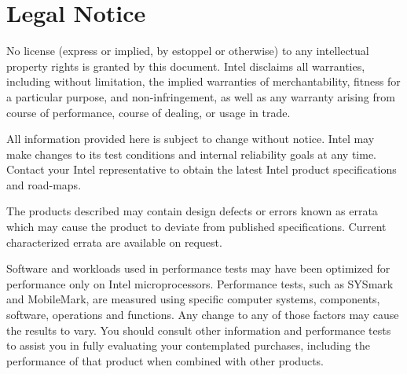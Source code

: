\hypertarget{index_DISCLAIMER}{}\section{Legal Notice}\label{index_DISCLAIMER}
No license (express or implied, by estoppel or otherwise) to any intellectual property rights is granted by this document. Intel disclaims all warranties, including without limitation, the implied warranties of merchantability, fitness for a particular purpose, and non-\/infringement, as well as any warranty arising from course of performance, course of dealing, or usage in trade. \par
All information provided here is subject to change without notice. Intel may make changes to its test conditions and internal reliability goals at any time. Contact your Intel representative to obtain the latest Intel product specifications and road-\/maps. \par
The products described may contain design defects or errors known as errata which may cause the product to deviate from published specifications. Current characterized errata are available on request. \par
Software and workloads used in performance tests may have been optimized for performance only on Intel microprocessors. Performance tests, such as S\-Y\-Smark and Mobile\-Mark, are measured using specific computer systems, components, software, operations and functions. Any change to any of those factors may cause the results to vary. You should consult other information and performance tests to assist you in fully evaluating your contemplated purchases, including the performance of that product when combined with other products. \par
